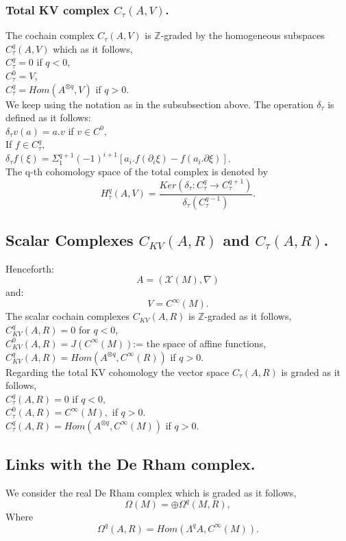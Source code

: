 \subsubsection{Total KV complex $C_\tau(A,V)$.}
The cochain complex $C_\tau(A,V)$ is $\mathbb{Z}$-graded by the homogeneous subspaces $C^q_\tau(A,V)$ which as it follows,\\
$C^q_\tau = 0$  if $q < 0$, \\
$C^0_\tau = V$, \\
$C^q_\tau = Hom(A^{\otimes q},V)$ if $q > 0.$\\
We keep using the notation as in the subsubsection above. The operation $\delta_\tau$ is defined as it follows:\\
$\delta_\tau v (a) = a.v$ if  $v\in C^0,$\\
If $f \in C^q_\tau,$\\
$\delta_\tau f(\xi) = \Sigma^{q+1}_1 (-1)^{i+1}[a_i.f(\partial_i\xi) - f(a_i.\partial\xi)]$.\\
The q-th cohomology space of the total complex is denoted by
$$H^q_\tau(A,V) = \frac{Ker(\delta_\tau: C^q_\tau \rightarrow C^{q+1}_\tau)}{\delta_\tau(C^{q-1}_\tau)}.$$
\subsection{Scalar Complexes $C_{KV}(A,R)$ and $C_\tau(A,R)$.}
Henceforth:
$$A = (\mathcal{X}(M),\nabla)$$
and:
$$V = C^\infty(M).$$
The scalar cochain complexes $C_{KV}(A,R)$ is $\mathbb{Z}$-graded as it follows,\\
$C^q_{KV}(A,R) = 0$ for $q < 0$,\\
$C^0_{KV}(A,R) = J(C^\infty(M))$:= the space of affine functions,\\
$C^q_{KV}(A,R) = Hom(A^{\otimes q},C^\infty(R))$ if $q > 0$.\\

Regarding the total KV cohomology the vector space $C_\tau(A,R)$ is graded as it follows,\\  
$C^q_\tau(A,R) = 0$ if $q < 0,$\\
$C^0_\tau(A,R)= C^\infty(M),$ if $q > 0$.\\
$C^q_\tau(A,R) = Hom(A^{\otimes q},C^\infty(M))$ if $q > 0$.\\
\subsection{Links with the De Rham complex.}
We consider the real De Rham complex which is graded as it follows,
$$\Omega(M) = \oplus \Omega^q(M,R),$$
Where
$$\Omega^q(A,R) = Hom(\Lambda^qA,C^\infty(M)).$$

